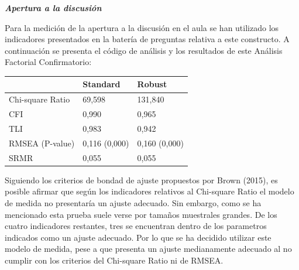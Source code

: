 \documentclass[12pt,twoside]{templates/facsothesis}
\begin{document}
\newpage

\textbf{\emph{Apertura a la discusión}}

Para la medición de la apertura a la discusión en el aula se han utilizado los indicadores presentados en la batería de preguntas relativa a este constructo. A continuación se presenta el código de análisis y los resultados de este Análisis Factorial Confirmatorio:

\begin{longtable}[]{@{}lll@{}}
\toprule
& Standard & Robust \\
\midrule
\endhead
Chi-square Ratio & 69,598 & 131,840 \\
CFI & 0,990 & 0,965 \\
TLI & 0,983 & 0,942 \\
RMSEA (P-value) & 0,116 (0,000) & 0,160 (0,000) \\
SRMR & 0,055 & 0,055 \\
\bottomrule
\end{longtable}

Siguiendo los criterios de bondad de ajuste propuestos por Brown (2015), es posible afirmar que según los indicadores relativos al Chi-square Ratio el modelo de medida no presentaría un ajuste adecuado. Sin embargo, como se ha mencionado esta prueba suele verse por tamaños muestrales grandes. De los cuatro indicadores restantes, tres se encuentran dentro de los parametros indicados como un ajuste adecuado. Por lo que se ha decidido utilizar este modelo de medida, pese a que presenta un ajuste medianamente adecuado al no cumplir con los criterios del Chi-square Ratio ni de RMSEA.



\end{document}
